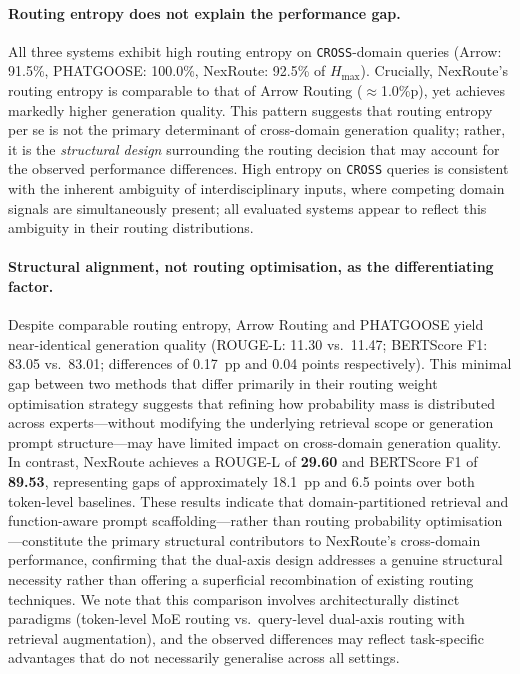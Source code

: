 \documentclass[a4paper,fleql]{cas-sc}
\begin{document}
\paragraph{Routing entropy does not explain the performance gap.}
All three systems exhibit high routing entropy on \texttt{CROSS}-domain queries
(Arrow: 91.5\%, PHATGOOSE: 100.0\%, NexRoute: 92.5\% of $H_{\max}$).
Crucially, NexRoute's routing entropy is comparable to that of Arrow Routing
(\textDelta$\approx$1.0\%p), yet achieves markedly higher generation quality.
This pattern suggests that routing entropy per se is not the primary
determinant of cross-domain generation quality; rather, it is the
\emph{structural design} surrounding the routing decision that may account
for the observed performance differences. High entropy on \texttt{CROSS}
queries is consistent with the inherent ambiguity of interdisciplinary inputs,
where competing domain signals are simultaneously present; all evaluated
systems appear to reflect this ambiguity in their routing distributions.

\paragraph{Structural alignment, not routing optimisation, as the differentiating factor.}
Despite comparable routing entropy, Arrow Routing and PHATGOOSE yield near-identical
generation quality (ROUGE-L: 11.30 vs.\ 11.47; BERTScore F1: 83.05 vs.\ 83.01;
differences of 0.17~pp and 0.04 points respectively). This minimal gap between two
methods that differ primarily in their routing weight optimisation strategy suggests
that refining how probability mass is distributed across experts---without modifying
the underlying retrieval scope or generation prompt structure---may have limited
impact on cross-domain generation quality. In contrast, NexRoute achieves a
ROUGE-L of \textbf{29.60} and BERTScore F1 of \textbf{89.53}, representing
gaps of approximately 18.1~pp and 6.5 points over both token-level baselines.
These results indicate that domain-partitioned retrieval and function-aware
prompt scaffolding---rather than routing probability optimisation---constitute
the primary structural contributors to NexRoute's cross-domain performance,
confirming that the dual-axis design addresses a genuine structural necessity
rather than offering a superficial recombination of existing routing techniques.
We note that this comparison involves architecturally distinct paradigms
(token-level MoE routing vs.\ query-level dual-axis routing with retrieval
augmentation), and the observed differences may reflect task-specific advantages
that do not necessarily generalise across all settings.
\end{document}
